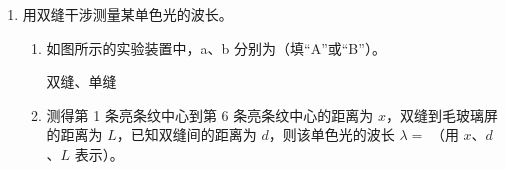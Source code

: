 \documentclass[\gkver]{gaokaozhenti}
\begin{document}
\begin{enumerate}
{	$qEx' - mgx' - \frac{1}{2}fx' = \frac{1}{2} \cdot 2mv^{2}$

	得 $mv^{2} = -(x' - 1)^{2} + 1$

	即：当 $x' = 1 \Um$ 时，$v$ 最大为 $1 \Ums$，故 A 正确，B 错误；

	C．当 $v = 0.6 \Ums$ 时，可得 $x = 0.2 \Um$ 或 $1.8 \Um$

	当 $x = 0.2 \Um$ 时，电场力做功 $qEx = 2.4 \UJ$

	则电势能减小 $2.4 \UJ$，由于 $E_{pO} = 0$，则电势能为 $-2.4 \UJ$，当 $x = 1.8 \Um$ 时

	$E_{pO} = -21.6 \UJ$

	故 C 正确；

	D．根据牛顿第二定律 $qE - f - mg = 2ma$

	当 $x = 0.2 \Um$ 时，系统加速度 $a = 0.8 \Umsq$

	对 B 有 $T - mg = ma$，得 $T = 10.8 \UN$。

	当 $x = 1.8 \Um$ 时，系统加速度 $a = -0.8 \Umsq$

	对 B 分析可得 $T = 9.2 \UN$。

	故 D 正确。

	故选 ACD。
}

\item
用双缝干涉测量某单色光的波长。

\begin{enumerate}
	\item
	如图所示的实验装置中，a、b 分别为（填“A”或“B”）。

	{双缝、单缝}
	\item
	测得第 1 条亮条纹中心到第 6 条亮条纹中心的距离为 $x$，双缝到毛玻璃屏的距离为 $L$，已知双缝间的距离为 $d$，则该单色光的波长 $\lambda =$ （用 $x$、$d$、$L$ 表示）。
\end{enumerate}


\end{enumerate}
\end{document}
